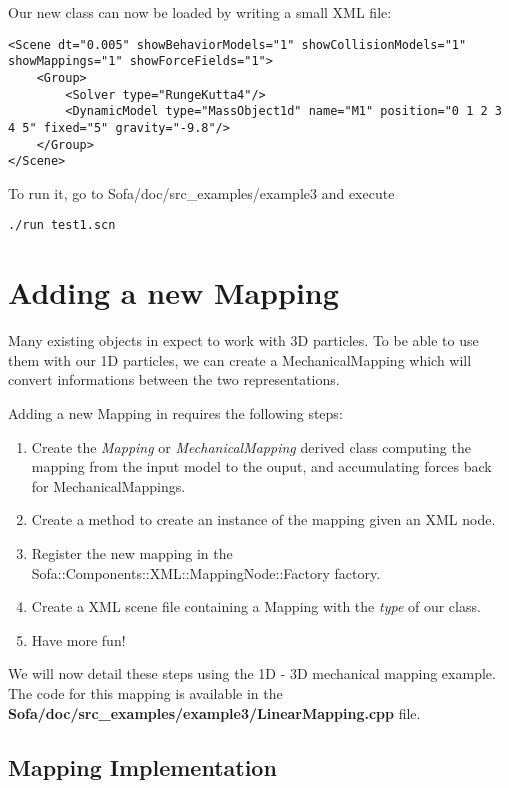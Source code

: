 Our new class can now be loaded by writing a small XML file:

\begin{verbatim}
<Scene dt="0.005" showBehaviorModels="1" showCollisionModels="1" showMappings="1" showForceFields="1">
	<Group>
		<Solver type="RungeKutta4"/>
		<DynamicModel type="MassObject1d" name="M1" position="0 1 2 3 4 5" fixed="5" gravity="-9.8"/>
	</Group>
</Scene>
\end{verbatim}

To run it, go to Sofa/doc/src\_examples/example3 and execute
\begin{verbatim}
./run test1.scn
\end{verbatim}

\section{Adding a new Mapping}

Many existing objects in \sofa{} expect to work with 3D particles. To be able to use them with our 1D particles, we can create a MechanicalMapping which will convert informations between the two representations.

Adding a new Mapping in \sofa{} requires the following steps:

\begin{enumerate}
\item Create the \textit{Mapping} or \textit{MechanicalMapping} derived class computing the mapping from the input model to the ouput, and accumulating forces back for MechanicalMappings.
\item Create a method to create an instance of the mapping given an XML node.
\item Register the new mapping in the Sofa::Components::XML::MappingNode::Factory factory.
\item Create a XML scene file containing a Mapping with the \textit{type} of our class.
\item Have more fun!
\end{enumerate}

We will now detail these steps using the 1D -\> 3D mechanical mapping example.
The code for this mapping is available in the \textbf{Sofa/doc/src\_examples/example3/LinearMapping.cpp} file.

\subsection{Mapping Implementation}


